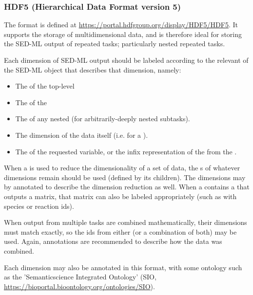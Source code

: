 \begin{blockChanged}
\subsubsection{HDF5 (Hierarchical Data Format version 5)}
\label{sec:dataFormatHDF5}
The format  is defined at \url{https://portal.hdfgroup.org/display/HDF5/HDF5}.  It supports the storage of multidimensional data, and is therefore ideal for storing the SED-ML output of repeated tasks; particularly nested repeated tasks.

Each dimension of SED-ML \RepeatedTask output should be labeled according to the relevant  of the SED-ML object that describes that dimension, namely:

\begin{itemize}
    \item The  of the top-level \RepeatedTask
    \item The  of the \SubTask
    \item The  of any nested \SubTask (for arbitrarily-deeply nested subtasks).
    \item The dimension of the data itself (i.e.  for a \UniformTimeCourse).
    \item The  of the requested variable, or the infix representation of the \Math from the \DataGenerator.
\end{itemize}

When a \DependentVariable is used to reduce the dimensionality of a set of data, the s of whatever dimensions remain should be used (defined by its \RemainingDimension children).  The dimensions may by annotated to describe the dimension reduction as well.  When a \DataGenerator contains a \DependentVariable that outputs a matrix, that matrix can also be labeled appropriately (such as with species or reaction ids).

When output from multiple tasks are combined mathematically, their dimensions must match exactly, so the ids from either (or a combination of both) may be used.  Again, annotations are recommended to describe how the data was combined.

Each dimension may also be annotated in this format, with some ontology such as the 'Semanticscience Integrated Ontology' (SIO, \url{https://bioportal.bioontology.org/ontologies/SIO}).

\end{blockChanged}


